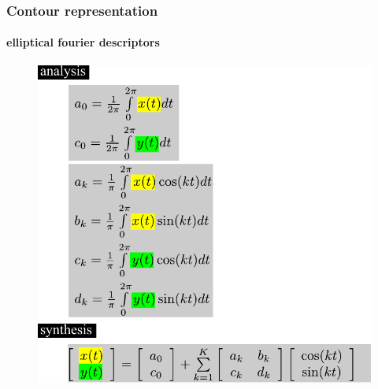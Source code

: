 \begin{frame}
\frametitle{Contour representation}
\framesubtitle{elliptical fourier descriptors}
\logoCSIPCPL\mypagenum
	\begin{figure}
		\includegraphics[height=0.8\textheight]{figs/theory_curves_ellipticalFourier.pdf}
	\end{figure}
\end{frame}






